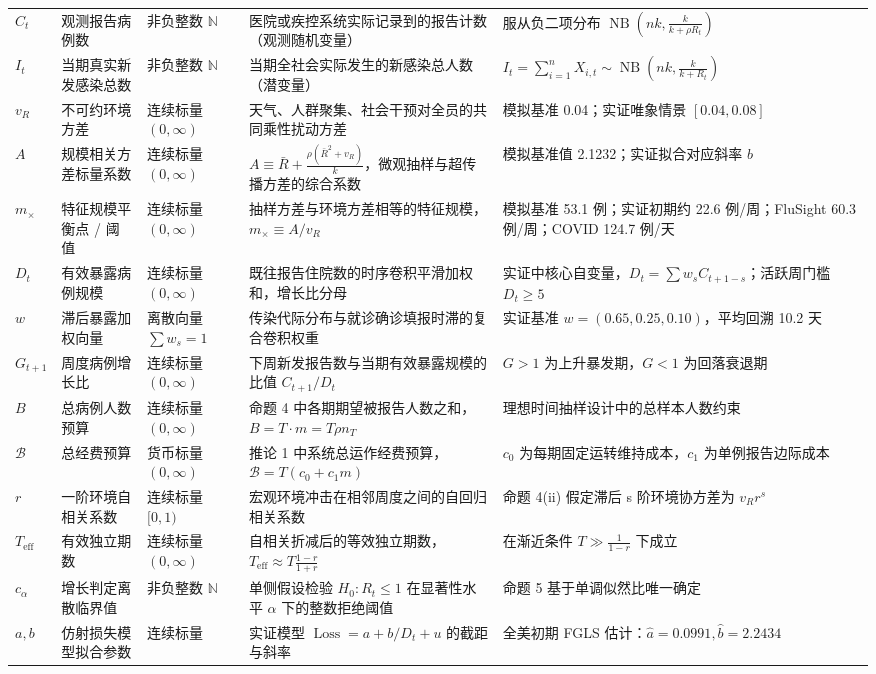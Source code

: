 \documentclass[11pt,a4paper]{ctexart}
\begin{document}
\begin{center}
\begin{longtable}{lllll}
\textbf{$C_t$} & 观测报告病例数 & 非负整数 $\mathbb{N}$ & 医院或疾控系统实际记录到的报告计数（观测随机变量） & 服从负二项分布 $\operatorname{NB}(nk, \frac{k}{k+\rho R_t})$ \\
\textbf{$I_t$} & 当期真实新发感染总数 & 非负整数 $\mathbb{N}$ & 当期全社会实际发生的新感染总人数（潜变量） & $I_t = \sum_{i=1}^n X_{i,t} \sim \operatorname{NB}(nk, \frac{k}{k+R_t})$ \\
\textbf{$v_R$} & 不可约环境方差 & 连续标量 $(0, \infty)$ & 天气、人群聚集、社会干预对全员的共同乘性扰动方差 & 模拟基准 0.04；实证唯象情景 $[0.04, 0.08]$ \\
\textbf{$A$} & 规模相关方差标量系数 & 连续标量 $(0, \infty)$ & $A \equiv \bar{R} + \frac{\rho(\bar{R}^2+v_R)}{k}$，微观抽样与超传播方差的综合系数 & 模拟基准值 2.1232；实证拟合对应斜率 $b$ \\
\textbf{$m_\times$} & 特征规模平衡点 / 阈值 & 连续标量 $(0, \infty)$ & 抽样方差与环境方差相等的特征规模，$m_\times \equiv A / v_R$ & 模拟基准 53.1 例；实证初期约 22.6 例/周；FluSight 60.3 例/周；COVID 124.7 例/天 \\
\textbf{$D_t$} & 有效暴露病例规模 & 连续标量 $(0, \infty)$ & 既往报告住院数的时序卷积平滑加权和，增长比分母 & 实证中核心自变量，$D_t = \sum w_s C_{t+1-s}$；活跃周门槛 $D_t \ge 5$ \\
\textbf{$w$} & 滞后暴露加权向量 & 离散向量 $\sum w_s = 1$ & 传染代际分布与就诊确诊填报时滞的复合卷积权重 & 实证基准 $w=(0.65, 0.25, 0.10)$，平均回溯 10.2 天 \\
\textbf{$G_{t+1}$} & 周度病例增长比 & 连续标量 $(0, \infty)$ & 下周新发报告数与当期有效暴露规模的比值 $C_{t+1}/D_t$ & $G > 1$ 为上升暴发期，$G < 1$ 为回落衰退期 \\
\textbf{$B$} & 总病例人数预算 & 连续标量 $(0, \infty)$ & 命题 4 中各期期望被报告人数之和，$B = T \cdot m = T \rho n_T$ & 理想时间抽样设计中的总样本人数约束 \\
\textbf{$\mathcal{B}$} & 总经费预算 & 货币标量 $(0, \infty)$ & 推论 1 中系统总运作经费预算，$\mathcal{B} = T(c_0 + c_1 m)$ & $c_0$ 为每期固定运转维持成本，$c_1$ 为单例报告边际成本 \\
\textbf{$r$} & 一阶环境自相关系数 & 连续标量 $[0, 1)$ & 宏观环境冲击在相邻周度之间的自回归相关系数 & 命题 4(ii) 假定滞后 s 阶环境协方差为 $v_R r^s$ \\
\textbf{$T_{\mathrm{eff}}$} & 有效独立期数 & 连续标量 $(0, \infty)$ & 自相关折减后的等效独立期数，$T_{\mathrm{eff}} \approx T \frac{1-r}{1+r}$ & 在渐近条件 $T \gg \frac{1}{1-r}$ 下成立 \\
\textbf{$c_\alpha$} & 增长判定离散临界值 & 非负整数 $\mathbb{N}$ & 单侧假设检验 $H_0: R_t \le 1$ 在显著性水平 $\alpha$ 下的整数拒绝阈值 & 命题 5 基于单调似然比唯一确定 \\
\textbf{$a, b$} & 仿射损失模型拟合参数 & 连续标量 & 实证模型 $\operatorname{Loss} = a + b/D_t + u$ 的截距与斜率 & 全美初期 FGLS 估计：$\hat{a} = 0.0991, \hat{b} = 2.2434$ \\
\end{longtable}
\end{center}
\end{document}
